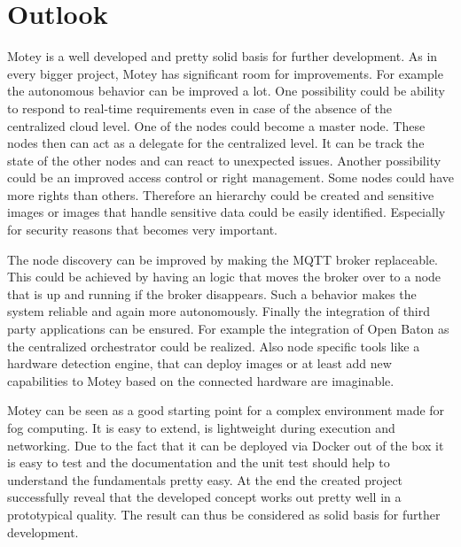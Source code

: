 



\section{Outlook}
Motey is a well developed and pretty solid basis for further development.
As in every bigger project, Motey has significant room for improvements.
For example the autonomous behavior can be improved a lot.
One possibility could be ability to respond to real-time requirements even in case of the absence of the centralized cloud level.
One of the nodes could become a master node.
These nodes then can act as a delegate for the centralized level.
It can be track the state of the other nodes and can react to unexpected issues.
Another possibility could be an improved access control or right management.
Some nodes could have more rights than others.
Therefore an hierarchy could be created and sensitive images or images that handle sensitive data could be easily identified.
Especially for security reasons that becomes very important.\newline

The node discovery can be improved by making the \ac{MQTT} broker replaceable.
This could be achieved by having an logic that moves the broker over to a node that is up and running if the broker disappears.
Such a behavior makes the system reliable and again more autonomously.
Finally the integration of third party applications can be ensured.
For example the integration of Open Baton as the centralized orchestrator could be realized.
Also node specific tools like a hardware detection engine, that can deploy images or at least add new capabilities to Motey based on the connected hardware are imaginable.\newline

Motey can be seen as a good starting point for a complex environment made for fog computing.
It is easy to extend, is lightweight during execution and networking.
Due to the fact that it can be deployed via Docker out of the box it is easy to test and the documentation and the unit test should help to understand the fundamentals pretty easy.
At the end the created project successfully reveal that the developed concept works out pretty well in a prototypical quality.
The result can thus be considered as solid basis for further development.
